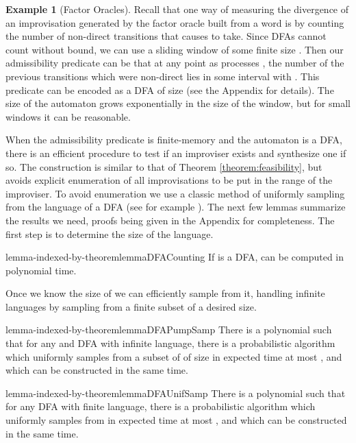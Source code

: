 \documentclass[a4paper,USenglish,numberwithinsect]{lipics}
\theoremstyle{plain}
\theoremstyle{definition}
\newtheorem{example-indexed-by-theorem}[theorem]{Example}
\begin{document}
\begin{example-indexed-by-theorem}[Factor Oracles]
Recall that one way of measuring the divergence of an improvisation
 generated by the factor oracle  built from a word  is by
counting the number of non-direct transitions that  causes  to
take. Since DFAs cannot count without bound, we can use a sliding window of some
finite size . Then our admissibility predicate  can be that
at any point as  processes , the number of the previous 
transitions which were non-direct lies in some interval 
with . This predicate can be encoded as a DFA
of size  (see the Appendix for details). The size of
the automaton grows exponentially in the size of the window, but for
small windows it can be reasonable. 
\end{example-indexed-by-theorem}

When the admissibility predicate is finite-memory and the automaton
 is a DFA, there is an efficient procedure to test
if an improviser exists and synthesize one if so. The construction is
similar to that of Theorem \ref{theorem:feasibility}, but avoids explicit enumeration of all
improvisations to be put in the range of the improviser. To avoid
enumeration we use a classic method of uniformly sampling from the
language of a DFA  (see for example
\cite{hickey-cohen,denise2006}). The next few lemmas summarize the
results we need, proofs being given in the Appendix for
completeness. The first step is to determine the size of the
language. 

\begin{restatable}{lemma-indexed-by-theorem}{lemmaDFACounting} \label{lemma-dfa-counting}
If  is a DFA,  can be computed in polynomial time.
\end{restatable}

Once we know the size of  we can efficiently sample
from it, handling infinite languages by sampling from a finite subset
of a desired size. 

\begin{restatable}{lemma-indexed-by-theorem}{lemmaDFAPumpSamp} \label{lemma-dfa-pump-samp}
There is a polynomial  such that for any  and DFA  with infinite language, there is a probabilistic algorithm  which uniformly samples from a subset of  of size  in expected time at most , and which can be constructed in the same time.
\end{restatable}

\begin{restatable}{lemma-indexed-by-theorem}{lemmaDFAUnifSamp} \label{lemma-dfa-unif-samp}
There is a polynomial  such that for any DFA  with finite language, there is a probabilistic algorithm  which uniformly samples from  in expected time at most , and which can be constructed in the same time.
\end{restatable}
\end{document}
